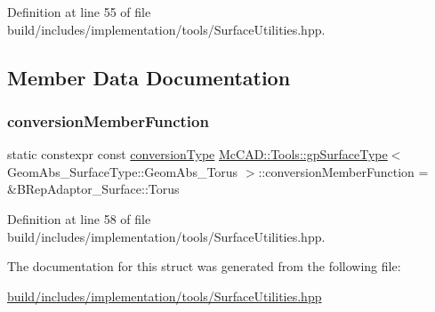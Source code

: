 Definition at line 55 of file build/includes/implementation/tools/\+Surface\+Utilities.\+hpp.



\subsection{Member Data Documentation}
\mbox{\label{structMcCAD_1_1Tools_1_1gpSurfaceType_3_01GeomAbs__SurfaceType_1_1GeomAbs__Torus_01_4_a036a4a3be85f8b7b14b8af2a02982000}} 
\subsubsection{\texorpdfstring{conversion\+Member\+Function}{conversionMemberFunction}}
{\footnotesize\ttfamily static constexpr const \hyperlink{structMcCAD_1_1Tools_1_1gpSurfaceType_3_01GeomAbs__SurfaceType_1_1GeomAbs__Torus_01_4_ad997fa3fbe5435cad71d40231540a40e}{conversion\+Type} \hyperlink{structMcCAD_1_1Tools_1_1gpSurfaceType}{Mc\+C\+A\+D\+::\+Tools\+::gp\+Surface\+Type}$<$ Geom\+Abs\+\_\+\+Surface\+Type\+::\+Geom\+Abs\+\_\+\+Torus $>$\+::conversion\+Member\+Function = \&B\+Rep\+Adaptor\+\_\+\+Surface\+::\+Torus\hspace{0.3cm}{\ttfamily [static]}}



Definition at line 58 of file build/includes/implementation/tools/\+Surface\+Utilities.\+hpp.



The documentation for this struct was generated from the following file\+:\begin{DoxyCompactItemize}
\item 
\hyperlink{build_2includes_2implementation_2tools_2SurfaceUtilities_8hpp}{build/includes/implementation/tools/\+Surface\+Utilities.\+hpp}\end{DoxyCompactItemize}
